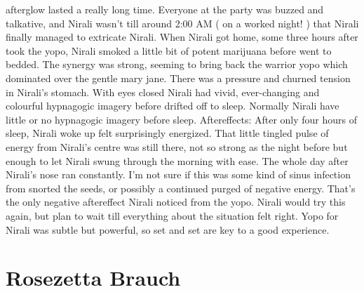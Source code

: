 \documentclass[12pt]{book}
\begin{document}
afterglow lasted a really long time. Everyone at the party was buzzed and talkative, and Nirali wasn't till around 2:00 AM ( on a worked night! ) that Nirali finally managed to extricate Nirali. When Nirali got home, some three hours after took the yopo, Nirali smoked a little bit of potent marijuana before went to bedded. The synergy was strong, seeming to bring back the warrior yopo which dominated over the gentle mary jane. There was a pressure and churned tension in Nirali's stomach. With eyes closed Nirali had vivid, ever-changing and colourful hypnagogic imagery before drifted off to sleep. Normally Nirali have little or no hypnagogic imagery before sleep. Aftereffects: After only four hours of sleep, Nirali woke up felt surprisingly energized. That little tingled pulse of energy from Nirali's centre was still there, not so strong as the night before but enough to let Nirali swung through the morning with ease. The whole day after Nirali's nose ran constantly. I'm not sure if this was some kind of sinus infection from snorted the seeds, or possibly a continued purged of negative energy. That's the only negative aftereffect Nirali noticed from the yopo. Nirali would try this again, but plan to wait till everything about the situation felt right. Yopo for Nirali was subtle but powerful, so set and set are key to a good experience.



\chapter{Rosezetta Brauch}
\end{document}
